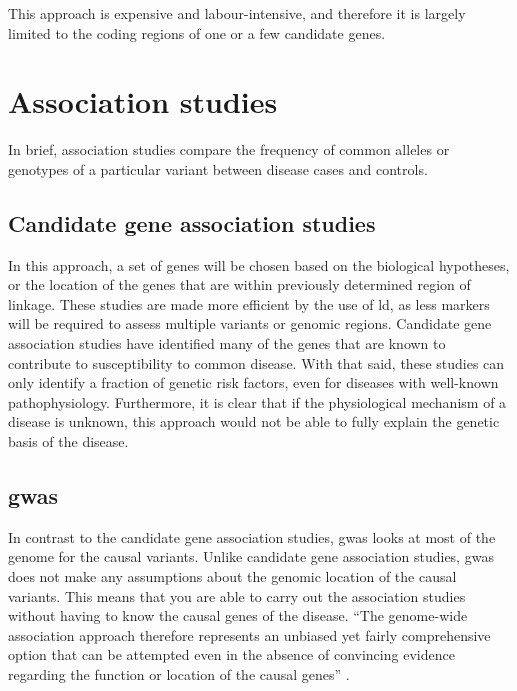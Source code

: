 This approach is expensive and labour-intensive, and therefore it is largely limited to the coding regions of one or a few candidate genes.

\section{Association studies}
\label{sec:association_studies}

In brief, association studies compare the frequency of common alleles or genotypes of  a particular variant between disease cases and controls.

\subsection{Candidate gene association studies}
\label{sub:candidate_gene_association_studies}

In this approach, a set of genes will be chosen based on the biological hypotheses, or the location of the genes that are within previously determined region of linkage.
These studies are made more efficient by the use of \gls{ld}, as less markers will be required to assess multiple variants or genomic regions.
Candidate gene association studies have identified many of the genes that are known to contribute to susceptibility to common disease.
With that said, these studies can only identify  a fraction of genetic risk factors, even for diseases with well-known pathophysiology.
Furthermore, it is clear that if the physiological mechanism of a disease is unknown, this approach would not be able to fully explain the genetic basis of the disease.

\subsection{\Acrfull{gwas}}
\label{sub:gwas}

In contrast to the candidate gene association studies, \gls{gwas} looks at most of the genome for the causal variants.
Unlike candidate gene association studies, \gls{gwas} does not make any assumptions about the genomic location of the causal variants.
This means that you are able to carry out the association studies without having to know the causal genes of the disease.
``The genome-wide association approach therefore represents an unbiased yet fairly comprehensive option that can be attempted even in the absence of convincing evidence regarding the function or location of the causal genes'' \citep{Hirschhorn2005}.


















